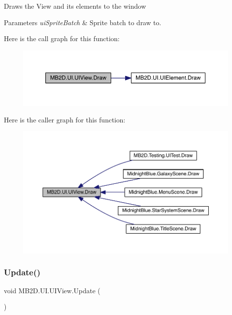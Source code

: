 Draws the View and its elements to the window 


\begin{DoxyParams}{Parameters}
{\em ui\+Sprite\+Batch} & Sprite batch to draw to.\\
\hline
\end{DoxyParams}
Here is the call graph for this function\+:\nopagebreak
\begin{figure}[H]
\begin{center}
\leavevmode
\includegraphics[width=350pt]{class_m_b2_d_1_1_u_i_1_1_u_i_view_a1f1acf013f17aa0738ff2d9b0516126e_cgraph}
\end{center}
\end{figure}
Here is the caller graph for this function\+:\nopagebreak
\begin{figure}[H]
\begin{center}
\leavevmode
\includegraphics[width=350pt]{class_m_b2_d_1_1_u_i_1_1_u_i_view_a1f1acf013f17aa0738ff2d9b0516126e_icgraph}
\end{center}
\end{figure}
\hypertarget{class_m_b2_d_1_1_u_i_1_1_u_i_view_a5628b6cd853a0f419eb8ac62958f62bb}{}\label{class_m_b2_d_1_1_u_i_1_1_u_i_view_a5628b6cd853a0f419eb8ac62958f62bb} 
\subsubsection{\texorpdfstring{Update()}{Update()}}
{\footnotesize\ttfamily void M\+B2\+D.\+U\+I.\+U\+I\+View.\+Update (\begin{DoxyParamCaption}{ }\end{DoxyParamCaption})\hspace{0.3cm}{\ttfamily [inline]}}



